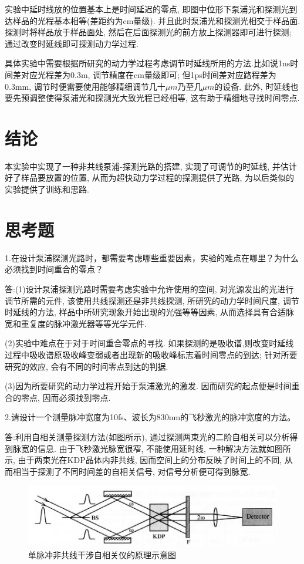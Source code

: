 \documentclass[aps,pre,12pt,preprint,%
	onecolumn,showpacs,showkeys,nofootinbib]{revtex4-2}
\begin{document}
    \par 实验中延时线放的位置基本上是时间延迟的零点, 即图中位形下泵浦光和探测光到达样品的光程基本相等(差距约为cm量级). 并且此时泵浦光和探测光相交于样品面. 探测时将样品放于样品面处, 然后在后面探测光的前方放上探测器即可进行探测; 通过改变时延线即可探测动力学过程.
    \par 具体实验中需要根据所研究的动力学过程考虑调节时延线所用的方法.比如说1ns时间差对应光程差为0.3m, 调节精度在cm量级即可; 但1ps时间差对应路程差为0.3mm, 调节时便需要使用能够精细调节几十$\mu m$乃至几$\mu m$的设备. 此外, 时延线也要先预调整使得泵浦光和探测光大致光程已经相等, 这有助于精细地寻找时间零点.
\section{结论}
本实验中实现了一种非共线泵浦-探测光路的搭建, 实现了可调节的时延线, 并估计好了样品要放置的位置, 从而为超快动力学过程的探测提供了光路, 为以后类似的实验提供了训练和思路.
\section{思考题}
1.在设计泵浦探测光路时，都需要考虑哪些重要因素，实验的难点在哪里？为什么必须找到时间重合的零点？ 
\par 答:(1)设计泵浦探测光路时需要考虑实验中允许使用的空间, 对光源发出的光进行调节所需的元件, 该使用共线探测还是非共线探测, 所研究的动力学时间尺度, 调节时延线的方法, 样品中所研究现象开始出现的光强等等因素, 从而选择具有合适脉宽和重复度的脉冲激光器等等光学元件.

(2)实验中难点在于对于时间重合零点的寻找. 如果探测的是吸收谱,则改变时延线过程中吸收谱原吸收峰变弱或者出现新的吸收峰标志着时间零点的到达; 针对所要研究的效应, 会有不同的时间零点到达的判据. 

(3)因为所要研究的动力学过程开始于泵浦激光的激发. 因而研究的起点便是时间重合的零点, 因而必须找到零点.

2.请设计一个测量脉冲宽度为10fs、波长为830nm的飞秒激光的脉冲宽度的方法。
\par 答:利用自相关测量探测方法(如图所示), 通过探测两束光的二阶自相关可以分析得到脉宽的信息. 由于飞秒激光脉宽很窄, 不能使用延时线, 一种解决方法就如图所示, 由于两束光在KDP晶体内非共线, 因而空间上的分布反映了时间上的不同, 从而相当于探测了不同时间差的自相关信号, 对信号分析便可得到脉宽.
	\begin{figure}[!h]
	\centering
	\includegraphics[width=.8\linewidth]{img/3.png}
	\caption[单脉冲非共线干涉自相关仪的原理示意图]{单脉冲非共线干涉自相关仪的原理示意图}\vspace{1ex}
	\end{figure}
\end{document}
